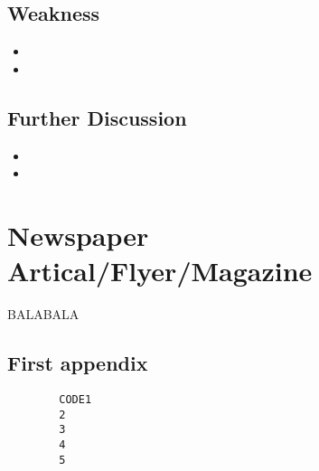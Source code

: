 \documentclass{mcmthesis}
\begin{document}
\subsection{Weakness}
\begin{itemize}
	\item
	\item
\end{itemize}
\subsection{Further Discussion}
\begin{itemize}
	\item
	\item
\end{itemize}

\section{Newspaper Artical/Flyer/Magazine}
BALABALA

\newpage
\newpage
\begin{thebibliography}{99}
\end{thebibliography}

\newpage
\newpage

\newpage
\newpage
\begin{appendices}
	\section{First appendix}
	\begin{lstlisting}
		CODE1
		2
		3
		4
		5
	\end{lstlisting}
\end{appendices}
\end{document}
